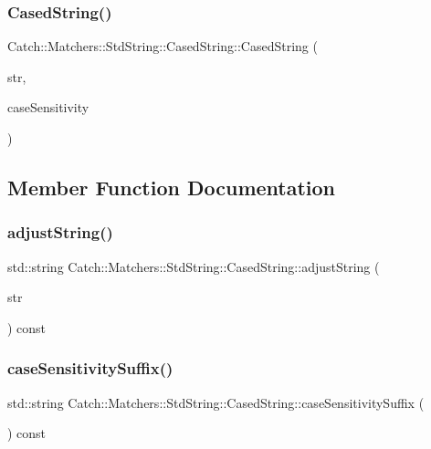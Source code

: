 \subsubsection{CasedString()}
{\footnotesize\ttfamily Catch\+::\+Matchers\+::\+Std\+String\+::\+Cased\+String\+::\+Cased\+String (\begin{DoxyParamCaption}\item[{std\+::string const \&}]{str,  }\item[{\textbf{ Case\+Sensitive\+::\+Choice}}]{case\+Sensitivity }\end{DoxyParamCaption})}



\subsection{Member Function Documentation}
\mbox{\label{struct_catch_1_1_matchers_1_1_std_string_1_1_cased_string_a77639b1165c01f424ee0e96f53335010}} 
\subsubsection{adjustString()}
{\footnotesize\ttfamily std\+::string Catch\+::\+Matchers\+::\+Std\+String\+::\+Cased\+String\+::adjust\+String (\begin{DoxyParamCaption}\item[{std\+::string const \&}]{str }\end{DoxyParamCaption}) const}

\mbox{\label{struct_catch_1_1_matchers_1_1_std_string_1_1_cased_string_a9759155344d696b2476d764a1d95fcc9}} 
\subsubsection{caseSensitivitySuffix()}
{\footnotesize\ttfamily std\+::string Catch\+::\+Matchers\+::\+Std\+String\+::\+Cased\+String\+::case\+Sensitivity\+Suffix (\begin{DoxyParamCaption}{ }\end{DoxyParamCaption}) const}



